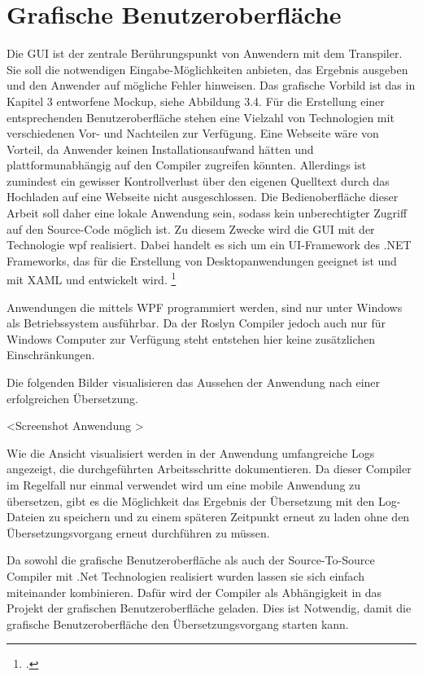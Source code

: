 \section{Grafische Benutzeroberfläche}
Die GUI ist der zentrale Berührungspunkt von Anwendern mit dem Transpiler.  Sie soll die notwendigen Eingabe-Möglichkeiten anbieten, das Ergebnis ausgeben und den Anwender auf mögliche Fehler hinweisen.  Das grafische Vorbild ist das in Kapitel 3 entworfene Mockup, siehe Abbildung 3.4.  Für die Erstellung einer entsprechenden Benutzeroberfläche stehen eine Vielzahl von Technologien mit verschiedenen Vor- und Nachteilen zur Verfügung.  Eine Webseite wäre von Vorteil, da Anwender keinen Installationsaufwand hätten und  plattformunabhängig auf den Compiler zugreifen könnten.  Allerdings ist zumindest ein gewisser Kontrollverlust über den eigenen Quelltext durch das  Hochladen auf eine Webseite nicht ausgeschlossen.  Die Bedienoberfläche dieser Arbeit soll daher eine lokale Anwendung sein, sodass kein  unberechtigter Zugriff auf den Source-Code möglich ist. Zu diesem Zwecke wird die GUI mit der Technologie \ac{wpf}  realisiert. Dabei handelt es sich um ein UI-Framework des .NET Frameworks, das für die Erstellung von Desktopanwendungen geeignet ist und mit XAML und \Csharp entwickelt wird. \footcite[Vgl.][S. 1f]{Wenger2012} 

Anwendungen die mittels WPF programmiert werden, sind nur unter Windows als Betriebssystem ausführbar.  Da der Roslyn Compiler jedoch auch nur für Windows Computer zur Verfügung steht entstehen hier keine zusätzlichen Einschränkungen. 

Die folgenden Bilder visualisieren das Aussehen der Anwendung nach einer erfolgreichen Übersetzung. 

<Screenshot Anwendung >

Wie die Ansicht visualisiert werden in der Anwendung umfangreiche Logs angezeigt,  die durchgeführten Arbeitsschritte dokumentieren.  Da dieser Compiler im Regelfall nur einmal verwendet wird um eine mobile Anwendung zu übersetzen,  gibt es  die Möglichkeit das Ergebnis der Übersetzung mit den Log-Dateien zu speichern und zu einem späteren Zeitpunkt erneut zu laden ohne den Übersetzungsvorgang erneut durchführen zu müssen.

Da sowohl die grafische Benutzeroberfläche als auch der Source-To-Source Compiler mit .Net Technologien realisiert wurden lassen sie sich einfach miteinander kombinieren.  Dafür wird der Compiler als Abhängigkeit in das Projekt der grafischen Benutzeroberfläche geladen.  Dies ist Notwendig,  damit die grafische Benutzeroberfläche den Übersetzungsvorgang starten kann. 


